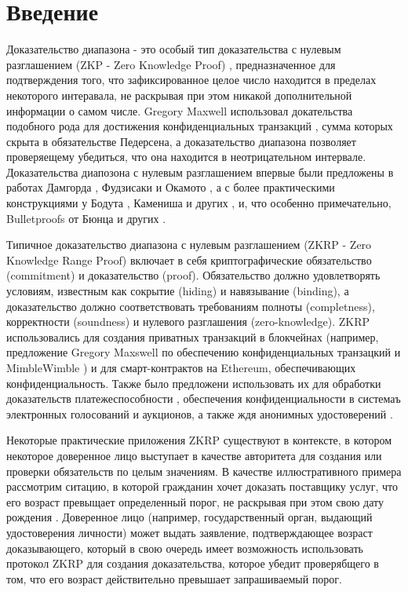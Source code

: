 \documentclass[a4paper]{report}
\begin{document}
	\tableofcontents

	\chapter{Введение}
	Доказательство диапазона - это особый тип доказательства с нулевым разглашением (ZKP - Zero Knowledge Proof) \cite{10.1145/22145.22178}, предназначенное для подтверждения того, что зафиксированное целое число находится в пределах некоторого интеравала, не раскрывая при этом никакой дополнительной информации о самом числе.
	Gregory Maxwell использовал докательства подобного рода для достижения конфиденциальных транзакций \cite{maxwell2016first}, сумма которых скрыта в обязательстве Педерсена, а доказательство диапазона позволяет проверяещему убедиться, что она находится в неотрицательном интервале.
	Доказательства диапозона с нулевым разглашением впервые были предложены в работах Дамгорда \cite{eurocrypt-1993-2249}, Фудзисаки и Окамото \cite{10.5555/646762.706160}, а с более практическими конструкциями у Бодута \cite{10.1007/3-540-45539-6_31}, Камениша и других \cite{10.1007/978-3-540-89255-7_15}, и, что особенно примечательно, Bulletproofs от Бюнца и других \cite{8418611}.

	Типичное доказательство диапазона с нулевым разглашением (ZKRP - Zero Knowledge Range Proof) включает в себя криптографические обязательство (commitment) и доказательство (proof).
	Обязательство должно удовлетворять условиям, известным как сокрытие (hiding) и навязывание (binding), а доказательство должно соответствовать требованиям полноты (completness), корректности (soundness) и нулевого разглашения (zero-knowledge).
	ZKRP использовались для создания приватных транзакций в блокчейнах (например, предложение Gregory Maxswell по обеспечению конфиденциальных транзацкий \cite{maxwell2016first} и MimbleWimble \cite{poelstra2016mimblewimble}) и для смарт-контрактов на Ethereum, обеспечивающих конфиденциальность.
	Также было предложени использовать их для обработки доказательств платежеспособности \cite{cryptoeprint:2020/468, 10.1145/2810103.2813674}, обеспечения конфиденциальности в системаъ электронных голосований и аукционов, а также ждя анонимных удостоверений \cite{morais2019survey}.

	Некоторые практические приложения ZKRP существуют в контексте, в котором некоторое доверенное лицо выступает в качестве авторитета для создания или проверки обязательств по целым значениям.
	В качестве иллюстративного примера рассмотрим ситацию, в которой гражданин хочет доказать поставщику услуг, что его возраст превыщает определенный порог, не раскрывая при этом свою дату рождения \cite{asecuritysite_11123, shah2017zeroknowledge}.
	Доверенное лицо (например, государственный орган, выдающий удостоверения личности) может выдать заявление, подтверждающее возраст доказывающего, который в свою очередь имеет возможность использовать протокол ZKRP для создания доказательства, которое убедит проверябщего в том, что его возраст действительно превышает запрашиваемый порог.
\end{document}

